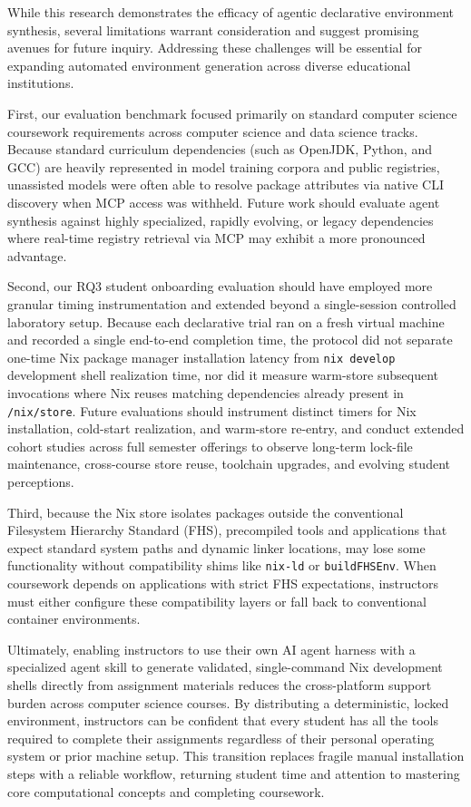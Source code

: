 While this research demonstrates the efficacy of agentic declarative environment
synthesis, several limitations warrant consideration and suggest promising avenues
for future inquiry. Addressing these challenges will be essential for expanding
automated environment generation across diverse educational institutions.

First, our evaluation benchmark focused primarily on standard computer science coursework
requirements across computer science and data science tracks. Because standard
curriculum dependencies (such as OpenJDK, Python, and GCC) are heavily
represented in model training corpora and public registries, unassisted models were
often able to resolve package attributes via native CLI discovery when MCP access
was withheld. Future work should evaluate agent synthesis against highly
specialized, rapidly evolving, or legacy dependencies where real-time registry
retrieval via MCP may exhibit a more pronounced advantage.

Second, our RQ3 student onboarding evaluation should have employed more granular timing
instrumentation and extended beyond a single-session controlled laboratory setup.
Because each declarative trial ran on a fresh virtual machine and recorded a
single end-to-end completion time, the protocol did not separate one-time Nix package
manager installation latency from \texttt{nix develop} development shell
realization time, nor did it measure warm-store subsequent invocations where Nix reuses
matching dependencies already present in \texttt{/nix/store}. Future evaluations should
instrument distinct timers for Nix installation, cold-start realization, and warm-store
re-entry, and conduct extended cohort studies across full semester offerings to
observe long-term lock-file maintenance, cross-course store reuse, toolchain
upgrades, and evolving student perceptions.

Third, because the Nix store isolates packages outside the conventional
Filesystem Hierarchy Standard (FHS), precompiled tools and applications that expect
standard system paths and dynamic linker locations, may lose some functionality
without compatibility shims like \texttt{nix-ld} or \texttt{buildFHSEnv}. When coursework
depends on applications with strict FHS expectations, instructors must either
configure these compatibility layers or fall back to conventional container
environments.

Ultimately, enabling instructors to use their own AI agent harness with a specialized
agent skill to generate validated, single-command Nix development shells
directly from assignment materials reduces the cross-platform support burden
across computer science courses. By distributing a deterministic, locked
environment, instructors can be confident that every student has all the tools required
to complete their assignments regardless of their personal operating system or prior
machine setup. This transition replaces fragile manual installation steps with a
reliable workflow, returning student time and attention to mastering core computational
concepts and completing coursework.
